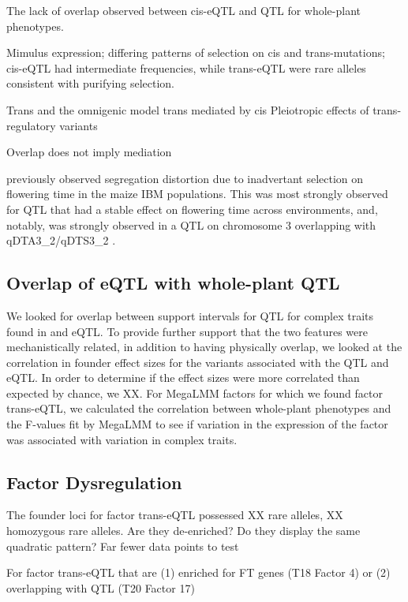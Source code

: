 \documentclass[article,9pt,twocolumn,twoside]{rilabRxiv}
\begin{document}
The lack of overlap observed between cis-eQTL and QTL for whole-plant phenotypes.

\cite{Brown} Mimulus expression; differing patterns of selection on cis and trans-mutations; cis-eQTL had intermediate frequencies, while trans-eQTL were rare alleles consistent with purifying selection. 

\cite{Liu5} Trans and the omnigenic model
\cite{Pierce} trans mediated by cis
\cite{VandeZande} Pleiotropic effects of trans-regulatory variants

Overlap does not imply mediation

\cite{Fu2} previously observed segregation distortion due to inadvertant selection on flowering time in the maize IBM populations.
This was most strongly observed for QTL that had a stable effect on flowering time across environments, and, notably, was strongly observed in a QTL on chromosome 3 overlapping with qDTA3\_2/qDTS3\_2 \citep{Liu7}.


\subsection{Overlap of eQTL with whole-plant QTL}
    We looked for overlap between support intervals for QTL for complex traits found in \cite{Odell} and eQTL. 
    To provide further support that the two features were mechanistically related, in addition to having physically overlap, we looked at the correlation in founder effect sizes for the variants associated with the QTL and eQTL.
    In order to determine if the effect sizes were more correlated than expected by chance, we XX.
    For MegaLMM factors for which we found factor trans-eQTL, we calculated the correlation between whole-plant phenotypes and the F-values fit by MegaLMM to see if variation in the expression of the factor was associated with variation in complex traits.


\subsection{Factor Dysregulation}
The founder loci for factor trans-eQTL possessed XX rare alleles, XX homozygous rare alleles.
Are they de-enriched?
Do they display the same quadratic pattern? Far fewer data points to test

For factor trans-eQTL that are (1) enriched for FT genes (T18 Factor 4) or (2) overlapping with QTL (T20 Factor 17)
\end{document}
